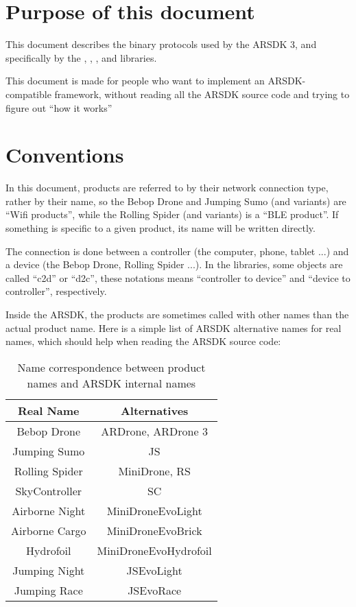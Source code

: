\section*{Purpose of this document}

This document describes the binary protocols used by the ARSDK 3, and specifically by the , , ,  and  libraries.


This document is made for people who want to implement an ARSDK-compatible framework, without reading all the ARSDK source code and trying to figure out ``how it works''

\section*{Conventions}

In this document, products are referred to by their network connection type, rather by their name, so the Bebop Drone and Jumping Sumo (and variants) are ``Wifi products'', while the Rolling Spider (and variants) is a ``BLE product''. If something is specific to a given product, its name will be written directly.

The connection is done between a controller (the computer, phone, tablet ...) and a device (the Bebop Drone, Rolling Spider ...). In the libraries, some objects are called ``c2d'' or ``d2c'', these notations means ``controller to device'' and ``device to controller'', respectively.

Inside the ARSDK, the products are sometimes called with other names than the actual product name. Here is a simple list of ARSDK alternative names for real names, which should help when reading the ARSDK source code:

\begin{table}[h]
\centering
\begin{tabular}{|c|c|}
  \hline
  Real Name & Alternatives \\
  \hline
  \hline
  Bebop Drone & ARDrone, ARDrone 3 \\
  \hline
  Jumping Sumo & JS \\
  \hline
  Rolling Spider & MiniDrone, RS \\
  \hline
  SkyController & SC \\
  \hline
  Airborne Night & MiniDroneEvoLight \\
  \hline
  Airborne Cargo & MiniDroneEvoBrick \\
  \hline
  Hydrofoil & MiniDroneEvoHydrofoil \\
  \hline
  Jumping Night & JSEvoLight \\
  \hline
  Jumping Race & JSEvoRace \\
  \hline
\end{tabular}
\caption{Name correspondence between product names and ARSDK internal names}
\end{table}

